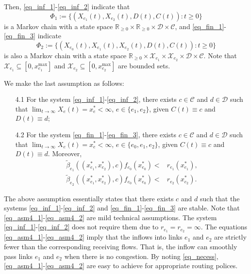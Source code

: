 Then, \eqref{eq_inf_1}-\eqref{eq_inf_2} indicate that
\begin{equation}
    \Phi_1:=\{(X_{e_1}(t), X_{e_2}(t), D(t), C(t)):t\geq0\} \label{eq_markovchain_1} 
\end{equation}
is a Markov chain with a state space $\mathbb{R}_{\geq0}\times\mathbb{R}_{\geq0}\times\mathcal{D}\times\mathcal{C}$, and \eqref{eq_fin_1}-\eqref{eq_fin_3} indicate 
\begin{equation}
    \Phi_2:=\{(X_{e_0}(t), X_{e_1}(t), X_{e_2}(t), D(t), C(t)):t\geq0\} \label{eq_markovchain_2}
\end{equation}
is also a Markov chain with a state space $\mathbb{R}_{\geq0}\times\mathcal{X}_{e_1}\times\mathcal{X}_{e_2}\times\mathcal{D}\times\mathcal{C}$. Note that $\mathcal{X}_{e_1}\subseteq[0, x_{e_1}^{\max}]$ and $\mathcal{X}_{e_2}\subseteq[0, x_{e_2}^{\max}]$ are bounded sets.

We make the last assumption as follows:
\begin{asm}
\quad

\begin{enumerate}
    \item[4.1] For the system \eqref{eq_inf_1}-\eqref{eq_inf_2}, there exists $c\in\mathcal{C}$ and $d\in\mathcal{D}$ such that $\lim_{t\to\infty} X_e(t)=x_e^*<\infty$, $e\in\{e_1,e_2\}$, given $C(t)\equiv c$ and $D(t)\equiv d$;
    \item[4.2] For the system \eqref{eq_fin_1}-\eqref{eq_fin_3}, there exists $c\in\mathcal{C}$ and $d\in\mathcal{D}$ such that $\lim_{t\to\infty} X_e(t)=x_e^*<\infty$, $e\in\{e_0,e_1,e_2\}$, given $C(t)\equiv c$ and $D(t)\equiv d$. Moreover, 
    \begin{subequations}
        \begin{align}
            \tilde{\beta}_{e_1}((x_{e_1}^*, x_{e_2}^*), c)f_{e_0}(x_{e_0}^*) <& r_{e_1}(x_{e_1}^*), \label{eq_asm4_1} \\
            \tilde{\beta}_{e_2}((x_{e_1}^*, x_{e_2}^*), c)f_{e_0}(x_{e_0}^*) <& r_{e_2}(x_{e_2}^*). \label{eq_asm4_2} 
        \end{align}
    \end{subequations}
\end{enumerate}
\end{asm}

The above assumption essentially states that there exists $c$ and $d$ such that the systems \eqref{eq_inf_1}-\eqref{eq_inf_2} and \eqref{eq_fin_1}-\eqref{eq_fin_3} are stable. Note that \eqref{eq_asm4_1}-\eqref{eq_asm4_2} are mild technical assumptions. The system \eqref{eq_inf_1}-\eqref{eq_inf_2} does not require them due to $r_{e_1}=r_{e_2}=\infty$. The equations \eqref{eq_asm4_1}-\eqref{eq_asm4_2} imply that the inflows into links $e_1$ and $e_2$ are strictly fewer than the corresponding receiving flows. That is, the inflow can smoothly pass links $e_1$ and $e_2$ when there is no congestion. By noting \eqref{eq_necess},  \eqref{eq_asm4_1}-\eqref{eq_asm4_2} are easy to achieve for appropriate routing polices.

